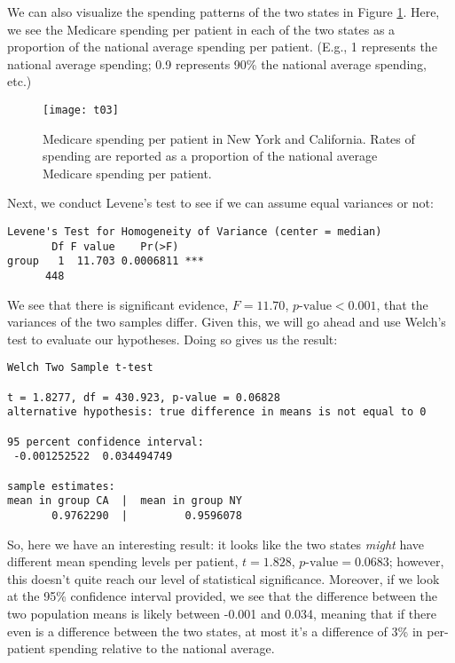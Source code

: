 We can also visualize the spending patterns of the two states in Figure \ref{fig:t03}. Here, we see the Medicare spending per patient in each of the two states as a proportion of the national average spending per patient. (E.g., 1 represents the national average spending; 0.9 represents 90\% the national average spending, etc.)

\begin{figure}[h]
\texttt{[image: t03]}
\caption{Medicare spending per patient in New York and California. Rates of spending are reported as a proportion of the national average Medicare spending per patient.}
\label{fig:t03}
\end{figure}

Next, we conduct Levene's test to see if we can assume equal variances or not:
\begin{framed}
\begin{Verbatim}[samepage=TRUE]
Levene's Test for Homogeneity of Variance (center = median)
       Df F value    Pr(>F)    
group   1  11.703 0.0006811 ***
      448  
\end{Verbatim}
\end{framed}

We see that there is significant evidence, $F=11.70$, $p\text{-value}<0.001$, that the variances of the two samples differ. Given this, we will go ahead and use Welch's test to evaluate our hypotheses. Doing so gives us the result:
\begin{framed}
\begin{Verbatim}[samepage=TRUE]
	Welch Two Sample t-test

t = 1.8277, df = 430.923, p-value = 0.06828
alternative hypothesis: true difference in means is not equal to 0

95 percent confidence interval:
 -0.001252522  0.034494749

sample estimates:
mean in group CA  |  mean in group NY 
       0.9762290  |         0.9596078 
\end{Verbatim}
\end{framed}

So, here we have an interesting result: it looks like the two states \textit{might} have different mean spending levels per patient, $t=1.828$, $p\text{-value}=0.0683$; however, this doesn't quite reach our level of statistical significance. Moreover, if we look at the 95\% confidence interval provided, we see that the difference between the two population means is likely between -0.001 and 0.034, meaning that if there even is a difference between the two states, at most it's a difference of 3\% in per-patient spending relative to the national average.

